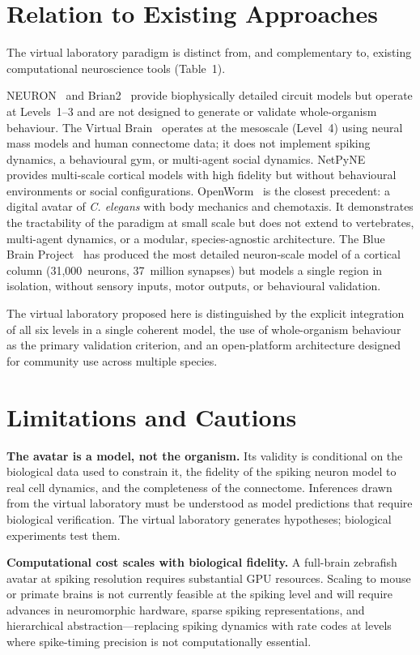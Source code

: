 \documentclass[12pt,a4paper]{article}
\begin{document}
\section*{Relation to Existing Approaches}

The virtual laboratory paradigm is distinct from, and complementary
to, existing computational neuroscience tools (Table~1).

NEURON~\cite{hines1997} and Brian2~\cite{stimberg2019} provide
biophysically detailed circuit models but operate at Levels~1--3 and
are not designed to generate or validate whole-organism behaviour.
The Virtual Brain~\cite{sanzleon2013} operates at the mesoscale
(Level~4) using neural mass models and human connectome data; it does
not implement spiking dynamics, a behavioural gym, or multi-agent
social dynamics.
NetPyNE~\cite{dura2019} provides multi-scale cortical models with
high fidelity but without behavioural environments or social
configurations.
OpenWorm~\cite{payne2018} is the closest precedent: a digital avatar
of \textit{C. elegans} with body mechanics and chemotaxis.
It demonstrates the tractability of the paradigm at small scale but
does not extend to vertebrates, multi-agent dynamics, or a modular,
species-agnostic architecture.
The Blue Brain Project~\cite{markram2015} has produced the most
detailed neuron-scale model of a cortical column (31,000~neurons,
37~million synapses) but models a single region in isolation, without
sensory inputs, motor outputs, or behavioural validation.

The virtual laboratory proposed here is distinguished by the explicit
integration of all six levels in a single coherent model, the use of
whole-organism behaviour as the primary validation criterion, and an
open-platform architecture designed for community use across multiple
species.


\section*{Limitations and Cautions}

\textbf{The avatar is a model, not the organism.}
Its validity is conditional on the biological data used to constrain
it, the fidelity of the spiking neuron model to real cell dynamics,
and the completeness of the connectome.
Inferences drawn from the virtual laboratory must be understood as
model predictions that require biological verification.
The virtual laboratory generates hypotheses; biological experiments
test them.

\textbf{Computational cost scales with biological fidelity.}
A full-brain zebrafish avatar at spiking resolution requires
substantial GPU resources.
Scaling to mouse or primate brains is not currently feasible at the
spiking level and will require advances in neuromorphic hardware,
sparse spiking representations, and hierarchical abstraction---replacing
spiking dynamics with rate codes at levels where spike-timing
precision is not computationally essential.
\end{document}
